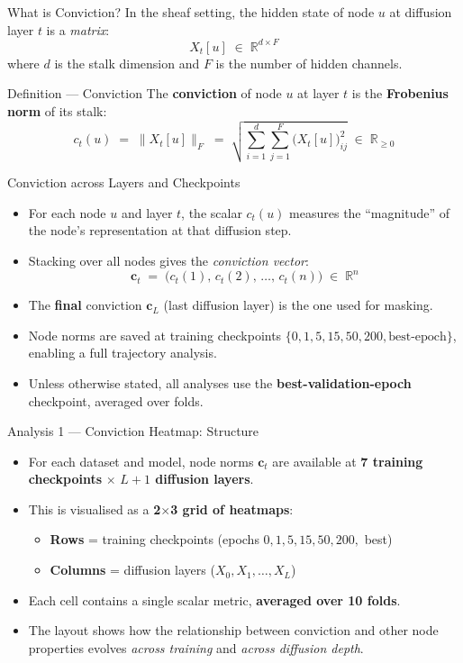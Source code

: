 \documentclass[11pt]{beamer}
\begin{document}
\begin{frame}{What is Conviction?}
In the sheaf setting, the hidden state of node $u$ at diffusion layer $t$ is a \emph{matrix}:
\[
    X_t[u] \;\in\; \mathbb{R}^{d \times F}
\]
where $d$ is the stalk dimension and $F$ is the number of hidden channels.
\bigskip
\begin{block}{Definition --- Conviction}
The \textbf{conviction} of node $u$ at layer $t$ is the \textbf{Frobenius norm} of its stalk:
\[
    c_t(u) \;=\; \bigl\| X_t[u] \bigr\|_F \;=\; \sqrt{\sum_{i=1}^{d}\sum_{j=1}^{F} \bigl(X_t[u]\bigr)_{ij}^2} \;\in\; \mathbb{R}_{\geq 0}
\]
\end{block}
\end{frame}


\begin{frame}{Conviction across Layers and Checkpoints}
\begin{itemize}
    \setlength\itemsep{1.2em}
    \item For each node $u$ and layer $t$, the scalar $c_t(u)$ measures the ``magnitude'' of the node's representation at that diffusion step.
    \item Stacking over all nodes gives the \emph{conviction vector}:
    \[
        \mathbf{c}_t \;=\; \bigl(c_t(1),\, c_t(2),\, \dots,\, c_t(n)\bigr) \;\in\; \mathbb{R}^n
    \]
    \item The \textbf{final} conviction $\mathbf{c}_L$ (last diffusion layer) is the one used for masking.
    \item Node norms are saved at training checkpoints $\{0, 1, 5, 15, 50, 200, \text{best-epoch}\}$, enabling a full trajectory analysis.
    \item Unless otherwise stated, all analyses use the \textbf{best-validation-epoch} checkpoint, averaged over folds.
\end{itemize}
\end{frame}


\begin{frame}{Analysis 1 --- Conviction Heatmap: Structure}
\begin{itemize}
    \setlength\itemsep{1em}
    \item For each dataset and model, node norms $\mathbf{c}_t$ are available at \textbf{7 training checkpoints} $\times$ \textbf{$L+1$ diffusion layers}.
    \item This is visualised as a \textbf{2$\times$3 grid of heatmaps}:
    \begin{itemize}
        \item \textbf{Rows} = training checkpoints (epochs $0, 1, 5, 15, 50, 200,$ best)
        \item \textbf{Columns} = diffusion layers ($X_0, X_1, \dots, X_L$)
    \end{itemize}
    \item Each cell contains a single scalar metric, \textbf{averaged over 10 folds}.
    \item The layout shows how the relationship between conviction and other node properties evolves \emph{across training} and \emph{across diffusion depth}.
\end{itemize}
\end{frame}
\end{document}
